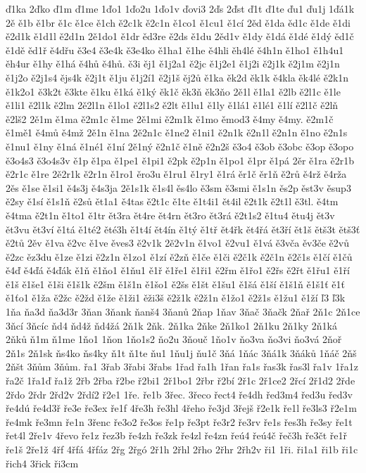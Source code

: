ď1ka
2ďko
ď1m
ď1me
1ďo1
1ďo2u
1ďo1v
ďovi3
2ďs
2ďst
ď1t
ď1te
ďu1
ďu1j
1ďá1k
2ě
ě1b
ě1br
ě1c
ě1ce
ě1ch
ě2c1k
ě2c1n
ě1co1
ě1cu1
ě1cí
2ěd
ě1da
ěd1c
ě1de
ě1di
ě2d1k
ě1d1l
ě2d1n
2ě1do1
ě1dr
ěd3re
ě2ds
ě1du
2ěd1v
ě1dy
ě1dá
ě1dé
ě1dý
ěd1č
ě1dě
ěd1ř
ě4dřu
ě3e4
ě3e4k
ě3e4ko
ě1ha1
ě1he
ě4hli
ěh4lé
ě4h1n
ě1ho1
ě1h4u1
ěh4ur
ě1hy
ě1há
ě4hů
ě4hů.
ě3i
ěj1
ě1j2a1
ě2jc
ě1j2e1
ě1j2i
ě2j1k
ě2j1m
ě2j1n
ě1j2o
ě2j1s4
ějs4k
ě2j1t
ě1ju
ě1j2í1
ě2j1š
ěj2ů
ě1ka
ěk2d
ěk1k
ě4kla
ěk4lé
ě2k1n
ě1k2o1
ě3k2t
ě3kte
ě1ku
ě1ká
ě1ký
ěk1č
ěk3ň
ěk3ňo
2ě1l
ě1la1
ě2lb
ě2l1c
ě1le
ě1li1
ě2l1k
ě2lm
2ě2l1n
ě1lo1
ě2l1s2
ě2lt
ě1lu1
ě1ly
ě1lá1
ě1lé1
ě1lí
ě2l1č
ě2lň
ě2lš2
2ě1m
ě1ma
ě2m1c
ě1me
2ě1mi
ě2m1k
ě1mo
ěmod3
ě4my
ě4my.
ě2m1č
ě1mě1
ě4mů
ě4mž
2ě1n
ě1na
2ě2n1c
ě1ne2
ě1ni1
ě2n1k
ě2n1l
ě2n1n
ě1no
ě2n1s
ě1nu1
ě1ny
ě1ná
ě1né1
ě1ní
2ě1ný
ě2n1č
ě1ně
ě2n2š
ě3o4
ě3ob
ě3obc
ě3op
ě3opo
ě3o4s3
ě3o4s3v
ě1p
ě1pa
ě1pe1
ě1pi1
ě2pk
ě2p1n
ě1po1
ě1pr
ě1pá
2ěr
ě1ra
ě2r1b
ě2r1c
ě1re
2ě2r1k
ě2r1n
ě1ro1
ěro3u
ě1ru1
ě1ry1
ě1rá
ěr1č
ěr1ň
ě2rů
ě4rž
ě4rža
2ěs
ě1se
ě1si1
ě4s3j
ě4s3ja
2ě1s1k
ě1s4l
ěs4lo
ě3sm
ě3smi
ě1s1n
ěs2p
ěst3v
ěsup3
ě2sy
ě1sí
ě1s1ň
ě2sů
ět1a1
ě4tas
ě2t1c
ě1te
ě1t4i1
ět4il
ě2t1k
ě2t1l
ě3tl.
ě4tm
ě4tma
ě2t1n
ě1to1
ě1tr
ět3ra
ět4re
ět4rn
ět3ro
ět3rá
ě2t1s2
ě1tu4
ětu4j
ět3v
ět3vu
ět3ví
ě1tá
ě1té2
ěté3h
ě1t4í
ět4ín
ě1tý
ě1tř
ět4řk
ět4řá
ět3ří
ět1š
ětš3t
ětš3ť
ě2tů
2ěv
ě1va
ě2vc
ě1ve
ěves3
ě2v1k
2ě2v1n
ě1vo1
ě2vu1
ě1vá
ě3vča
ěv3če
ě2vů
ě2zc
ěz3du
ě1ze
ě1zi
ě2z1n
ě1zo1
ě1zí
ě2zň
ě1če
ě1či
ě2č1k
ě2č1n
ě2č1s
ě1čí
ě1čů
ě4ď
ě4ďá
ě4ďák
ě1ň
ě1ňo1
ě1ňu1
ě1ř
ě1ře1
ě1ři1
ě2řm
ě1řo1
ě2řs
ě2řt
ě1řu1
ě1ří
ě1š
ě1še1
ě1ši
ě1š1k
ě2šm
ě1š1n
ě1šo1
ě2šs
ě1št
ě1šu1
ě1šá
ě1ší
ě1š1ň
ě1š1ť
ě1ť
ě1ťo1
ě1ža
ě2žc
ě2žd
ě1že
ě1ži1
ěži3š
ě2ž1k
ě2ž1n
ě1žo1
ě2ž1s
ě1žu1
ě1ží
ľ3
ľ3k
1ňa
ňa3d
ňa3d3r
3ňan
3ňank
ňanš4
3ňanů
2ňap
1ňav
3ňač
3ňačk
2ňař
2ň1c
2ň1ce
3ňcí
3ňcíc
ňd4
ňd4ž
ňd4žá
2ň1k
2ňk.
2ň1ka
2ňke
2ň1ko1
2ň1ku
2ň1ky
2ň1ká
2ňků
ň1m
ň1me
1ňo1
1ňon
1ňo1s2
ňo2u
3ňouč
1ňo1v
ňo3va
ňo3vi
ňo3vá
2ňoř
2ň1s
2ň1sk
ňs4ko
ňs4ky
ň1t
ň1te
ňu1
1ňu1j
ňu1č
3ňá
1ňác
3ňá1k
3ňáků
1ňáč
2ňš
2ňšt
3ňům
3ňům.
řa1
3řab
3řabi
3řabs
1řad
řa1h
1řan
řa1s
řas3k
řas3l
řa1v
1řa1z
řa2č
1řa1ď
řa1ž
2řb
2řba
ř2be
ř2bi1
2ř1bo1
2řbr
ř2bí
2ř1c
2ř1ce2
2řcí
2ř1d2
2řde
2řdo
2řdr
2řd2v
2řdí2
ř2e1
1ře.
ře1b
3řec.
3řeco
řect4
ře4dh
řed3m4
řed3u
řed3v
ře4dú
ře4d3ř
ře3e
ře3ex
ře1f
4ře3h
ře3hl
4řeho
ře3jd
3řejš
ř2e1k
ře1l
ře3ls3
ř2e1m
ře4mk
ře3mn
ře1n
3řenc
ře3o2
ře3os
ře1p
ře3pt
ře3r2
ře3rv
ře1s
řes3h
ře3sy
ře1t
řet4l
2ře1v
4řevo
ře1z
řez3b
ře4zh
ře3zk
ře4zl
ře4zn
řeú4
řeú4č
řeč3h
ře3čt
ře1ř
ře1š
2ře1ž
4řf
4řfá
4řfáz
2řg
2řgó
2ř1h
2řhl
2řho
2řhr
2řh2v
ři1
1ři.
ři1a1
ři1b
ři1c
řich4
3řick
ři3cm
